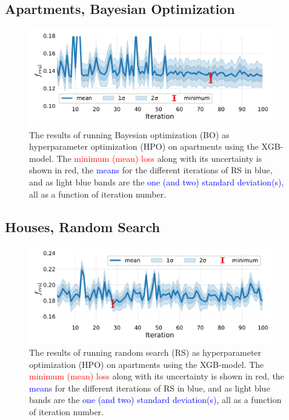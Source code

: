 \subsection*{Apartments, Bayesian Optimization}
\begin{figure}[h!]
  \includegraphics[width=0.95\textwidth, trim=0 0 0 0, clip]{figures/housing/Ejerlejlighed_v19_cut_all_Ncols_all_xgb_score_over_time_BO.pdf}
  \caption[Bayesian Optimization Results as a Function of Iteration for Apartments]
          {The results of running Bayesian optimization (BO) as hyperparameter optimization (HPO) on apartments using the XGB-model. The \textcolor{red}{minimum (mean) loss} along with its uncertainty is shown in red, the \textcolor{blue}{means} for the different iterations of RS in blue, and as light blue bands are the \textcolor{blue}{one (and two) standard deviation(s)}, all as a function of iteration number.} 
  \label{fig:h:CV_res_BO_uncertainties_ejer}
\end{figure}
\clearpage

\FloatBarrier
\subsection*{Houses, Random Search}
\begin{figure}
  \centerfloat
  \includegraphics[width=0.95\textwidth, trim=10 20 10 10, clip]{figures/housing/Villa_v19_cut_all_Ncols_all_xgb_score_over_time_random.pdf}
  \caption[Random Search Results as a Function of Iteration for Houses]
          {The results of running random search (RS) as hyperparameter optimization (HPO) on apartments using the XGB-model. The \textcolor{red}{minimum (mean) loss} along with its uncertainty is shown in red, the \textcolor{blue}{means} for the different iterations of RS in blue, and as light blue bands are the \textcolor{blue}{one (and two) standard deviation(s)}, all as a function of iteration number.} 
\end{figure}
\vspace{3cm}
\FloatBarrier
